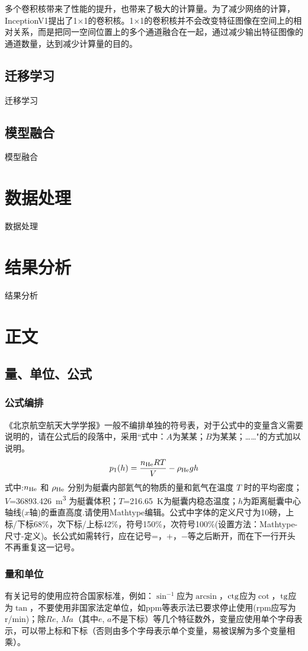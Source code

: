 \documentclass[10.5pt,twocolumn]{jbuaa}
\begin{document}
多个卷积核带来了性能的提升，也带来了极大的计算量。为了减少网络的计算，InceptionV1提出了1×1的卷积核。1×1的卷积核并不会改变特征图像在空间上的相对关系，而是把同一空间位置上的多个通道融合在一起，通过减少输出特征图像的通道数量，达到减少计算量的目的。
\subsection{迁移学习}
迁移学习
\subsection{模型融合}
模型融合

\section{数据处理}
数据处理

\section{结果分析}
结果分析

\section{正文}
\subsection{量、单位、公式}
\subsubsection{公式编排}
\label{labSecForm}
《北京航空航天大学学报》一般不编排单独的符号表，对于公式中的变量含义需要说明的，请在公式后的段落中，采用``式中：$A$为某某；$B$为某某；……"的方式加以说明。
\begin{equation}
\label{eqnLabelp}
p_1 (h) = \dfrac{n_{\textnormal{He}}RT}{V}-\rho_{\textnormal{He}}gh
\end{equation}
式中:$n_{\textnormal{He}}$ 和 $\rho_{\textnormal{He}}$ 分别为艇囊内部氦气的物质的量和氦气在温度 $T$ 时的平均密度；
$V$=\SI{36893.426}{\cubic\meter}%
为艇囊体积；$T$=\SI{216.65}{\kelvin}为艇囊内稳态温度；$h$为距离艇囊中心轴线($x$轴)的垂直高度.请使用Mathtype编辑。公式中字体的定义尺寸为10磅，上标/下标68\%，次下标/上标42\%，符号150\%，次符号100\%(设置方法：Mathtype-尺寸-定义)。长公式如需转行，应在记号=，+，$-$等之后断开，而在下一行开头不再重复这一记号。

\subsubsection{量和单位}
有关记号的使用应符合国家标准，例如：$\sin^{-1}$应为$\arcsin$，$\rm ctg$应为$\cot$，$\rm tg$应为$\tan$，不要使用非国家法定单位，如ppm等表示法已要求停止使用(rpm应写为r/min)；除$Re$, $Ma$（其中$e$, $a$不是下标）等几个特征数外，变量应使用单个字母表示，可以带上标和下标（否则由多个字母表示单个变量，易被误解为多个变量相乘）。
\end{document}

